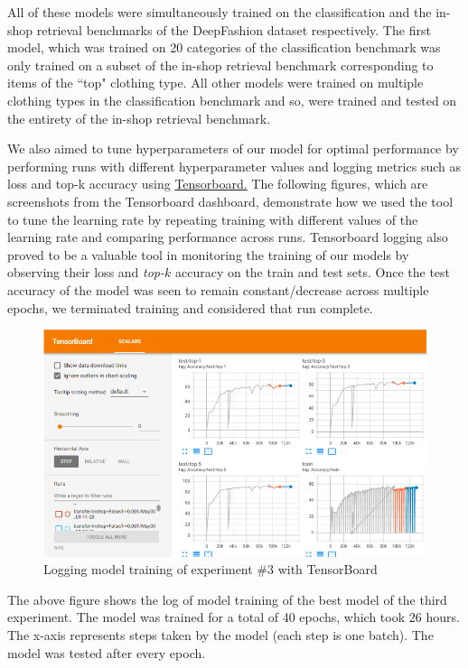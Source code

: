 All of these models were simultaneously trained on the classification and the in-shop retrieval benchmarks of the DeepFashion dataset respectively. The first model, which was trained on 20 categories of the classification benchmark was only trained on a subset of the in-shop retrieval benchmark corresponding to items of the ``top" clothing type. All other models were trained on multiple clothing types in the classification benchmark and so, were trained and tested on the entirety of the in-shop retrieval benchmark.

We also aimed to tune hyperparameters of our model for optimal performance by performing runs with different hyperparameter values and logging metrics such as loss and top-k accuracy using \href{https://www.tensorflow.org/tensorboard}{Tensorboard.} The following figures, which are screenshots from the Tensorboard dashboard, demonstrate how we used the tool to tune the learning rate by repeating training with different values of the learning rate and comparing performance across runs. Tensorboard logging also proved to be a valuable tool in monitoring the training of our models by observing their loss and \textit{top-$k$} accuracy on the train and test sets. Once the test accuracy of the model was seen to remain constant/decrease across multiple epochs, we terminated training and considered that run complete. 

\begin{figure}[H]
\includegraphics[width=15cm]{images/tensorboard.PNG} 
\centering
\caption{Logging model training of experiment \#3 with TensorBoard}
\label{architecture}
\end{figure}

The above figure shows the log of model training of the best model of the third experiment. The model was trained for a total of 40 epochs, which took 26 hours. The x-axis represents steps taken by the model (each step is one batch). The model was tested after every epoch. 

